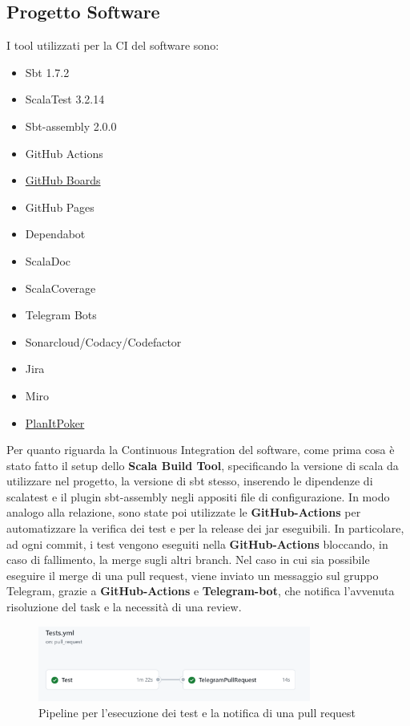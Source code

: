     \subsection{Progetto Software}
        I tool utilizzati per la CI del software sono:
        \begin{itemize}
            \item Sbt 1.7.2
            \item ScalaTest 3.2.14
            \item Sbt-assembly 2.0.0
            \item GitHub Actions
            \item \href{https://github.com/orgs/ISIQuiz/projects/3}{GitHub Boards}
            \item GitHub Pages
            \item Dependabot
            \item ScalaDoc
            \item ScalaCoverage
            \item Telegram Bots
            \item Sonarcloud/Codacy/Codefactor
            \item Jira
            \item Miro
            \item \href{https://www.planitpoker.com}{PlanItPoker}
        \end{itemize}
        
        Per quanto riguarda la Continuous Integration del software, come prima cosa è stato fatto il setup dello \textbf{Scala Build Tool}, specificando la versione di scala da utilizzare nel progetto, la versione di sbt stesso, inserendo le dipendenze di scalatest e il plugin sbt-assembly negli appositi file di configurazione. In modo analogo alla relazione, sono state poi utilizzate le \textbf{GitHub-Actions} per automatizzare la verifica dei test e per la release dei jar eseguibili. In particolare, ad ogni commit, i test vengono eseguiti nella \textbf{GitHub-Actions} bloccando, in caso di fallimento, la merge sugli altri branch. Nel caso in cui sia possibile eseguire il merge di una pull request, viene inviato un messaggio sul gruppo Telegram, grazie a \textbf{GitHub-Actions} e \textbf{Telegram-bot}, che notifica l'avvenuta risoluzione del task e la necessità di una review.
        
        \begin{figure}[H]
            \centering
            \includegraphics[width=0.8\textwidth]{Images/CI-Test-PR.png}
            \caption{Pipeline per l'esecuzione dei test e la notifica di una pull request}
            \label{fig:CI-Test-PR}
        \end{figure}

